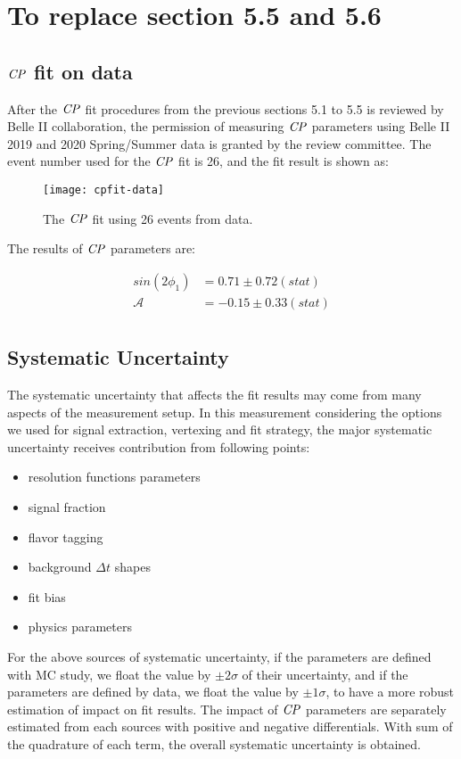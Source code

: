 \chapter{To replace section 5.5 and 5.6}

\section{$\it{CP}$ fit on data}
After the $\it{CP}$ fit procedures from the previous sections 5.1 to 5.5 is reviewed by Belle II collaboration, the permission of measuring $\it{CP}$ parameters using Belle II 2019 and 2020 Spring/Summer data is granted by the review committee. The event number used for the $\it{CP}$ fit is 26, and the fit result is shown as: 

\begin{figure}[H]
\centering
\texttt{[image: cpfit-data]}
\caption{The $\it{CP}$ fit using 26 events from data.}
\end{figure}

The results of $\it{CP}$ parameters are: 

\begin{equation}
\begin{split}
sin(2\phi_1) & = 0.71 \pm 0.72(stat) \\
\mathcal{A} & = -0.15 \pm 0.33(stat)\\
\end{split}
\end{equation} 

\section{Systematic Uncertainty}
The systematic uncertainty that affects the fit results may come from many aspects of the measurement setup. 
In this measurement considering the options we used for signal extraction, vertexing and fit strategy, the major systematic uncertainty receives contribution from following points:

\begin{itemize}
	\item resolution functions parameters
	\item signal fraction
	\item flavor tagging 
	\item background $\Delta t$ shapes
	\item fit bias
	\item physics parameters
\end{itemize}
For the above sources of systematic uncertainty, if the parameters are defined with MC study, we float the value by $\pm 2 \sigma$ of their uncertainty, and if the parameters are defined by data, we float the value by $\pm 1 \sigma$, to have a more robust estimation of impact on fit results. The impact of $\it{CP}$ parameters are separately estimated from each sources with positive and negative differentials. With sum of the quadrature of each term, the overall systematic uncertainty is obtained. 

